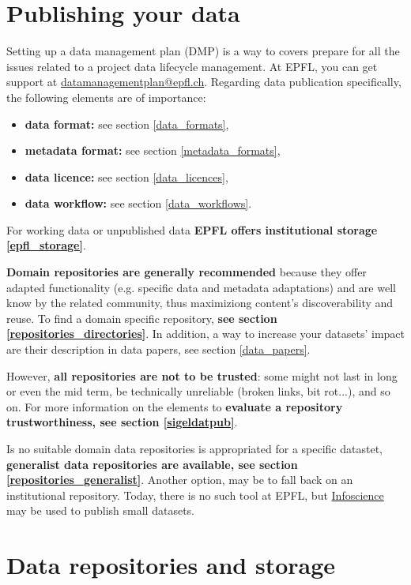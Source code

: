 \section{Publishing your data}

Setting up a data management plan (DMP) is a way to covers prepare for all the issues related to a project data lifecycle management. At EPFL, you can get support at \href{mailto:datamanagementplan@epfl.ch}{datamanagementplan@epfl.ch}. Regarding data publication specifically, the following elements are of importance:
\begin{itemize}
\item \textbf{data format:} see section \ref{data_formats},
\item \textbf{metadata format:} see section \ref{metadata_formats},
\item \textbf{data licence:} see section \ref{data_licences},
\item \textbf{data workflow:} see section \ref{data_workflows}.
\end{itemize}

For working data or unpublished data \textbf{EPFL offers institutional storage \ref{epfl_storage}}.

\textbf{Domain repositories are generally recommended} because they offer adapted functionality (e.g. specific data and metadata adaptations) and are well know by the related community, thus maximiziong content's discoverability and reuse. To find a domain specific repository, \textbf{see section \ref{repositories_directories}}. In addition, a way to increase your datasets' impact are their description in data papers, see section \ref{data_papers}.

However, \textbf{all repositories are not to be trusted}: some might not last in long or even the mid term, be technically unreliable (broken links, bit rot...), and so on. For more information on the elements to \textbf{evaluate a repository trustworthiness, see section \ref{sigeldatpub}}.

Is no suitable domain data repositories is appropriated for a specific datastet, \textbf{generalist data repositories are available, see section \ref{repositories_generalist}}. Another option, may be to fall back on an institutional repository. Today, there is no such tool at EPFL, but \href{http://infoscience.epfl.ch}{Infoscience} may be used to publish small datasets. 

\section{Data repositories and storage}

